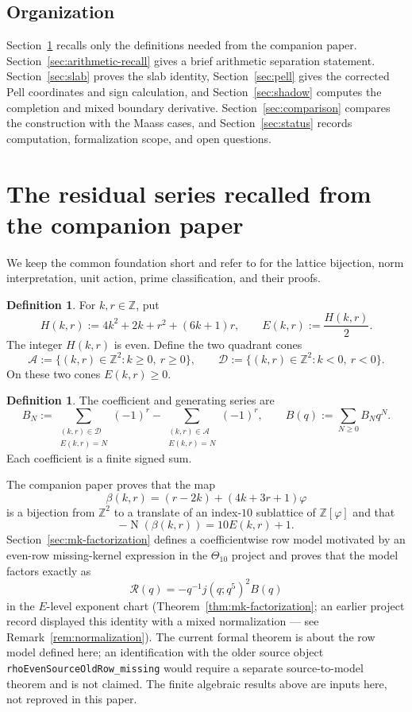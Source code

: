 \documentclass[12pt]{amsart}
\theoremstyle{definition}
\newtheorem{definition}[theorem]{Definition}
\theoremstyle{remark}
\DeclareMathOperator{\N}{N}
\newcommand{\ZZ}{\mathbb{Z}}
\newcommand{\ph}{\varphi}
\newcommand{\Acone}{\mathcal{A}}
\newcommand{\Dcone}{\mathcal{D}}
\begin{document}
\subsection*{Organization}
Section~\ref{sec:foundations} recalls only the definitions needed from
the companion paper.  Section~\ref{sec:arithmetic-recall} gives a brief
arithmetic separation statement.  Section~\ref{sec:slab} proves the
slab identity, Section~\ref{sec:pell} gives the corrected Pell
coordinates and sign calculation, and Section~\ref{sec:shadow}
computes the completion and mixed boundary derivative.  Section~\ref{sec:comparison}
compares the construction with the Maass cases, and
Section~\ref{sec:status} records computation, formalization scope, and
open questions.

\section{The residual series recalled from the companion paper}
\label{sec:foundations}

We keep the common foundation short and refer to \cite{companion} for
the lattice bijection, norm interpretation, unit action, prime
classification, and their proofs.

\begin{definition}\label{def:E}
For $k,r\in\ZZ$, put
\[
  H(k,r):=4k^2+2k+r^2+(6k+1)r,
  \qquad E(k,r):=\frac{H(k,r)}2.
\]
The integer $H(k,r)$ is even.  Define the two quadrant cones
\[
  \Acone:=\{(k,r)\in\ZZ^2:k\geq0,\ r\geq0\},
  \qquad
  \Dcone:=\{(k,r)\in\ZZ^2:k<0,\ r<0\}.
\]
On these two cones $E(k,r)\geq0$.
\end{definition}

\begin{definition}\label{def:B}
The coefficient and generating series are
\[
  B_N:=
  \sum_{\substack{(k,r)\in\Dcone\\E(k,r)=N}}(-1)^r
  -
  \sum_{\substack{(k,r)\in\Acone\\E(k,r)=N}}(-1)^r,
  \qquad
  B(q):=\sum_{N\geq0}B_Nq^N.
\]
Each coefficient is a finite signed sum.
\end{definition}

The companion paper proves that the map
\[
  \beta(k,r)=(r-2k)+(4k+3r+1)\ph
\]
is a bijection from $\ZZ^2$ to a translate of an index-$10$ sublattice
of $\ZZ[\ph]$ and that
\[
  -\N(\beta(k,r))=10E(k,r)+1.
\]
Section~\ref{sec:mk-factorization} defines a coefficientwise row model
motivated by an even-row missing-kernel expression in the $\Theta_{10}$
project and proves that the model factors exactly as
\[
  \mathcal R(q)=-q^{-1}j(q;q^5)^2B(q)
\]
in the $E$-level exponent chart
(Theorem~\ref{thm:mk-factorization}; an earlier project record
displayed this identity with a mixed normalization --- see
Remark~\ref{rem:normalization}).  The current formal theorem is about
the row model defined here; an identification with the older source
object \texttt{rhoEvenSourceOldRow\_missing} would require a separate
source-to-model theorem and is not claimed.  The finite algebraic
results above are inputs here, not reproved in this paper.
\end{document}
